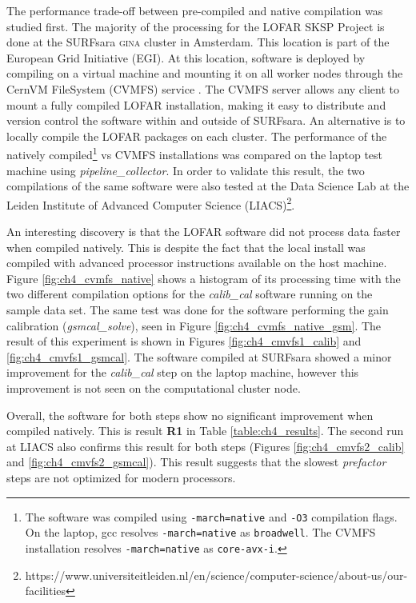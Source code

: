The performance trade-off between pre-compiled and native compilation was studied first. The majority of the processing for the LOFAR SKSP Project \citep{lotss} is done at the SURFsara \textsc{gina} cluster in Amsterdam. This location is part of the European Grid Initiative (EGI)\citep{SurfSara}. At this location, software is deployed by compiling on a virtual machine and mounting it on all worker nodes through the CernVM FileSystem (CVMFS) service \citep{cvmfs}. The CVMFS server allows any client to mount a fully compiled LOFAR installation, making it easy to distribute and version control the software within and outside of SURFsara. An alternative is to locally compile the LOFAR packages on each cluster. The performance of the natively compiled\footnote{The software was compiled using \texttt{-march=native} and \texttt{-O3} compilation flags. On the laptop, gcc resolves \texttt{-march=native} as \texttt{broadwell}. The CVMFS installation resolves \texttt{-march=native} as \texttt{core-avx-i}.} vs CVMFS installations was compared on the laptop test machine using \textit{pipeline\_collector}. In order to validate this result, the two compilations of the same software were also tested at the Data Science Lab at the Leiden Institute of Advanced Computer Science (LIACS)\footnote{https://www.universiteitleiden.nl/en/science/computer-science/about-us/our-facilities}. 
 
An interesting discovery is that the LOFAR software did not process data faster when compiled natively. This is despite the fact that the local install was compiled with advanced processor instructions available on the host machine.  Figure \ref{fig:ch4_cvmfs_native} shows a histogram of its processing time with the two different compilation options for the \textit{calib\_cal} software running on the sample data set. The same test was done for the software performing the gain calibration (\textit{gsmcal\_solve}), seen in Figure \ref{fig:ch4_cvmfs_native_gsm}. The result of this experiment is shown in Figures \ref{fig:ch4_cmvfs1_calib} and \ref{fig:ch4_cmvfs1_gsmcal}.  The software compiled at SURFsara showed a minor improvement for the \textit{calib\_cal} step on the laptop machine, however this improvement is not seen on the computational cluster node. 

Overall, the software for both steps show no significant improvement when compiled natively. This is result \textbf{R1} in Table \ref{table:ch4_results}. The second run at LIACS also confirms this result for both steps (Figures \ref{fig:ch4_cmvfs2_calib} and \ref{fig:ch4_cmvfs2_gsmcal}). This result suggests that the slowest \textit{prefactor} steps are not optimized for modern processors. 

